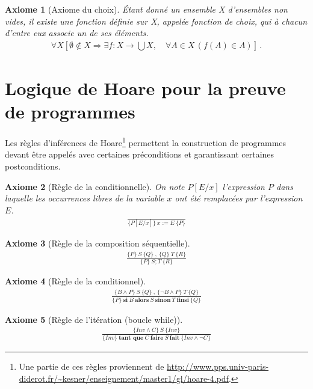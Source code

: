 \documentclass[10pt,a4paper]{article}
\newtheorem{axiom}{Axiome}[section]
\begin{document}
\begin{axiom}[Axiome du choix] Étant donné un ensemble X d'ensembles non vides, il existe une fonction définie sur X, appelée fonction de choix, qui à chacun d'entre eux associe un de ses éléments.
\begin{align}
\forall X \left[ \emptyset \notin X \Rightarrow \exists f: X \rightarrow \bigcup X, \quad \forall A \in X \, ( f(A) \in A ) \right] \,. 
\end{align}
\end{axiom}

\section{Logique de Hoare pour la preuve de programmes}
\label{Hoare}

Les règles d'inférences de Hoare\footnote{Une partie de ces règles proviennent de \url{http://www.pps.univ-paris-diderot.fr/~kesner/enseignement/master1/gl/hoare-4.pdf}.} permettent la construction de programmes devant être appelés avec certaines préconditions et garantissant certaines postconditions.

\begin{axiom}[Règle de la conditionnelle]
On note $P[E/x]$ l'expression $P$ dans laquelle les occurrences libres de la variable $x$ ont été remplacées par l'expression $E$.
\begin{align}
\frac{}{\{P[E/x]\}\ x:=E \ \{P\} }
\end{align}
\end{axiom}

\begin{axiom}[Règle de la composition séquentielle]
\begin{align}
\frac {\{P\}\ S\ \{Q\}\ , \ \{Q\}\ T\ \{R\} } {\{P\}\ S;T\ \{R\}}
\end{align}
\end{axiom}

\begin{axiom}[Règle de la conditionnel]
\begin{align}
\frac { \{B \wedge P\}\ S\ \{Q\}\ ,\ \{\neg B \wedge P \}\ T\ \{Q\} } { \{P\}\ \textbf{si}\ B\ \textbf{alors}\ S\ \textbf{sinon}\ T\ \textbf{finsi}\ \{Q\} }
\end{align}
\end{axiom}

\begin{axiom}[Règle de l'itération (boucle while)]
\begin{align}
\frac { \{Inv \wedge C \}\ S\ \{Inv \} } { \{Inv \}\ \textbf{tant que}\ C\ \textbf{faire}\ S\ \textbf{fait}\ \{Inv \wedge \neg C \} }
\end{align}
\end{axiom}
\end{document}
